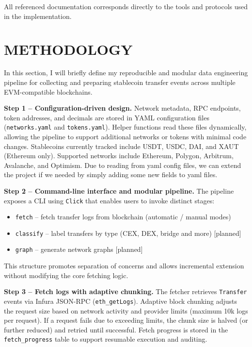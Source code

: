 \documentclass[a4paper,12pt]{report}
\begin{document}
All referenced documentation corresponds directly to the tools and protocols used in the implementation.

\chapter{METHODOLOGY}
In this section, I will briefly define my reproducible and modular data engineering pipeline for collecting and preparing stablecoin transfer events across multiple EVM-compatible blockchains.

\textbf{Step 1 -- Configuration-driven design.}  
Network metadata, RPC endpoints, token addresses, and decimals are stored in YAML configuration files (\texttt{networks.yaml} and \texttt{tokens.yaml}). Helper functions read these files dynamically, allowing the pipeline to support additional networks or tokens with minimal code changes. Stablecoins currently tracked include USDT, USDC, DAI, and XAUT (Ethereum only). Supported networks include Ethereum, Polygon, Arbitrum, Avalanche, and Optimism. Due to reading from yaml config files, we can extend the project if we needed by simply adding some new fields to yaml files.

\textbf{Step 2 -- Command-line interface and modular pipeline.}  
The pipeline exposes a CLI using \texttt{Click} that enables users to invoke distinct stages:
\begin{itemize}
    \item \texttt{fetch} -- fetch transfer logs from blockchain (automatic / manual modes)
    \item \texttt{classify} -- label transfers by type (CEX, DEX, bridge and more) [planned]
    \item \texttt{graph} -- generate network graphs [planned]
\end{itemize}
This structure promotes separation of concerns and allows incremental extension without modifying the core fetching logic.

\textbf{Step 3 -- Fetch logs with adaptive chunking.}
The fetcher retrieves \texttt{Transfer} events via Infura JSON-RPC (\texttt{eth\_getLogs}). Adaptive block chunking adjusts the request size based on network activity and provider limits (maximum 10k logs per request). If a request fails due to exceeding limits, the chunk size is halved (or further reduced) and retried until successful. Fetch progress is stored in the \texttt{fetch\_progress} table to support resumable execution and auditing.
\end{document}
